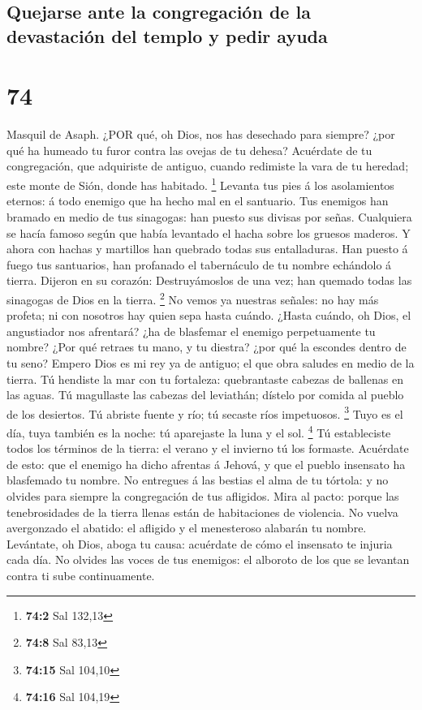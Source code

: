 \hypertarget{quejarse-ante-la-congregaciuxf3n-de-la-devastaciuxf3n-del-templo-y-pedir-ayuda}{%
\subsection{Quejarse ante la congregación de la devastación del templo y
pedir
ayuda}\label{quejarse-ante-la-congregaciuxf3n-de-la-devastaciuxf3n-del-templo-y-pedir-ayuda}}

\hypertarget{section-73}{%
\section{74}\label{section-73}}

 Masquil de Asaph. ¿POR qué, oh Dios, nos has desechado para
siempre? ¿por qué ha humeado tu furor contra las ovejas de tu dehesa?
 Acuérdate de tu congregación, que adquiriste de antiguo,
cuando redimiste la vara de tu heredad; este monte de Sión, donde has
habitado. \footnote{\textbf{74:2} Sal 132,13}  Levanta tus
pies á los asolamientos eternos: á todo enemigo que ha hecho mal en el
santuario.  Tus enemigos han bramado en medio de tus
sinagogas: han puesto sus divisas por señas.  Cualquiera se
hacía famoso según que había levantado el hacha sobre los gruesos
maderos.  Y ahora con hachas y martillos han quebrado todas
sus entalladuras.  Han puesto á fuego tus santuarios, han
profanado el tabernáculo de tu nombre echándolo á tierra. 
Dijeron en su corazón: Destruyámoslos de una vez; han quemado todas las
sinagogas de Dios en la tierra. \footnote{\textbf{74:8} Sal 83,13}
 No vemos ya nuestras señales: no hay más profeta; ni con
nosotros hay quien sepa hasta cuándo.  ¿Hasta cuándo, oh
Dios, el angustiador nos afrentará? ¿ha de blasfemar el enemigo
perpetuamente tu nombre?  ¿Por qué retraes tu mano, y tu
diestra? ¿por qué la escondes dentro de tu seno?  Empero
Dios es mi rey ya de antiguo; el que obra saludes en medio de la tierra.
 Tú hendiste la mar con tu fortaleza: quebrantaste cabezas
de ballenas en las aguas.  Tú magullaste las cabezas del
leviathán; dístelo por comida al pueblo de los desiertos. 
Tú abriste fuente y río; tú secaste ríos impetuosos. \footnote{\textbf{74:15}
  Sal 104,10}  Tuyo es el día, tuya también es la noche: tú
aparejaste la luna y el sol. \footnote{\textbf{74:16} Sal 104,19}
 Tú estableciste todos los términos de la tierra: el verano
y el invierno tú los formaste.  Acuérdate de esto: que el
enemigo ha dicho afrentas á Jehová, y que el pueblo insensato ha
blasfemado tu nombre.  No entregues á las bestias el alma
de tu tórtola: y no olvides para siempre la congregación de tus
afligidos.  Mira al pacto: porque las tenebrosidades de la
tierra llenas están de habitaciones de violencia.  No
vuelva avergonzado el abatido: el afligido y el menesteroso alabarán tu
nombre.  Levántate, oh Dios, aboga tu causa: acuérdate de
cómo el insensato te injuria cada día.  No olvides las
voces de tus enemigos: el alboroto de los que se levantan contra ti sube
continuamente.

